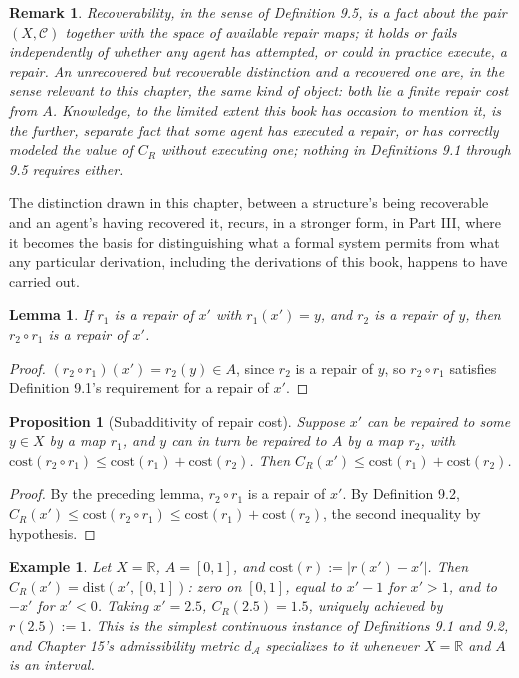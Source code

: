 \documentclass[11pt]{book}
\newtheorem{lemma}[theorem]{Lemma}
\newtheorem{proposition}[theorem]{Proposition}
\newtheorem{remark}[theorem]{Remark}
\newtheorem{example}[theorem]{Example}
\begin{document}
\begin{remark}
Recoverability, in the sense of Definition 9.5, is a fact about the pair $(X, \mathcal C)$ together with the space of available repair maps; it holds or fails independently of whether any agent has attempted, or could in practice execute, a repair. An unrecovered but recoverable distinction and a recovered one are, in the sense relevant to this chapter, the same kind of object: both lie a finite repair cost from $A$. Knowledge, to the limited extent this book has occasion to mention it, is the further, separate fact that some agent has executed a repair, or has correctly modeled the value of $C_R$ without executing one; nothing in Definitions 9.1 through 9.5 requires either.
\end{remark}

The distinction drawn in this chapter, between a structure's being recoverable and an agent's having recovered it, recurs, in a stronger form, in Part III, where it becomes the basis for distinguishing what a formal system permits from what any particular derivation, including the derivations of this book, happens to have carried out.

\begin{lemma}
If $r_1$ is a repair of $x'$ with $r_1(x') = y$, and $r_2$ is a repair of $y$, then $r_2 \circ r_1$ is a repair of $x'$.
\end{lemma}

\begin{proof}
$(r_2 \circ r_1)(x') = r_2(y) \in A$, since $r_2$ is a repair of $y$, so $r_2 \circ r_1$ satisfies Definition 9.1's requirement for a repair of $x'$.
\end{proof}

\begin{proposition}[Subadditivity of repair cost]
Suppose $x'$ can be repaired to some $y \in X$ by a map $r_1$, and $y$ can in turn be repaired to $A$ by a map $r_2$, with $\mathrm{cost}(r_2 \circ r_1) \leq \mathrm{cost}(r_1) + \mathrm{cost}(r_2)$. Then $C_R(x') \leq \mathrm{cost}(r_1) + \mathrm{cost}(r_2)$.
\end{proposition}

\begin{proof}
By the preceding lemma, $r_2 \circ r_1$ is a repair of $x'$. By Definition 9.2, $C_R(x') \leq \mathrm{cost}(r_2\circ r_1) \leq \mathrm{cost}(r_1) + \mathrm{cost}(r_2)$, the second inequality by hypothesis.
\end{proof}

\begin{example}
Let $X = \mathbb R$, $A = [0,1]$, and $\mathrm{cost}(r) := |r(x')-x'|$. Then $C_R(x') = \mathrm{dist}(x', [0,1])$: zero on $[0,1]$, equal to $x'-1$ for $x' > 1$, and to $-x'$ for $x' < 0$. Taking $x' = 2.5$, $C_R(2.5) = 1.5$, uniquely achieved by $r(2.5) := 1$. This is the simplest continuous instance of Definitions 9.1 and 9.2, and Chapter 15's admissibility metric $d_{\mathcal A}$ specializes to it whenever $X = \mathbb R$ and $A$ is an interval.
\end{example}
\end{document}
